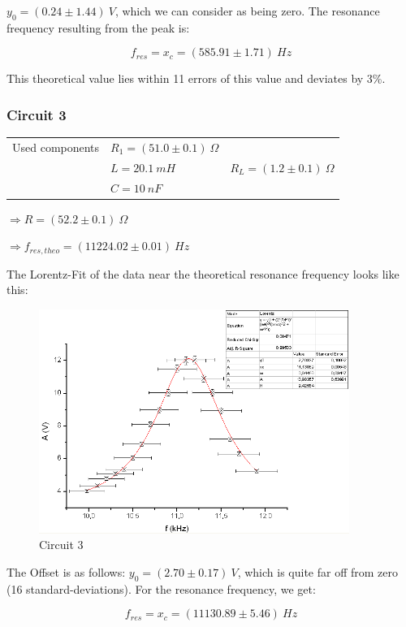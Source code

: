 $y_0 = (0.24 \pm 1.44)\ V$, which we can consider as being zero. The resonance frequency resulting from the peak is: 

$$\boxed{ f_{res} = x_c = (585.91 \pm 1.71)\ Hz}$$

This theoretical value lies within 11 errors of this value and deviates by 3\%.


\subsubsection{Circuit 3}

\begin{tabular}{l l l}
Used components & $R_1 = (51.0 \pm 0.1)\ \Omega$ & \\
 & $L=20.1\ mH$ & $R_L = (1.2 \pm 0.1)\ \Omega$\\
 & $C=10\ nF$ & \\
\end{tabular}

$\Rightarrow R = (52.2 \pm 0.1)\ \Omega$

$\Rightarrow f_{res,theo} = (11224.02 \pm 0.01)\ Hz$

The Lorentz-Fit of the data near the theoretical resonance frequency looks like this:

\begin{figure}[H]
\centering \includegraphics[width=0.9\textwidth]{Bilder/1c.png}
\caption{Circuit 3}
\end{figure}

The Offset is as follows: $y_0 = (2.70 \pm 0.17)\ V$, which is quite far off from zero (16 standard-deviations). For the resonance frequency, we get:

$$\boxed{ f_{res} = x_c = ( 11130.89 \pm 5.46)\ Hz}$$


